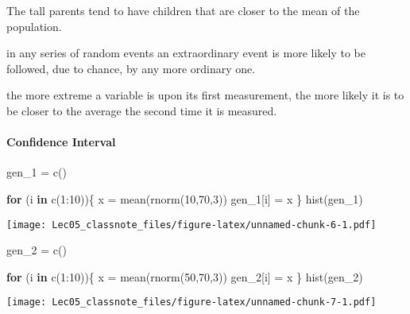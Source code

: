 \documentclass[
]{article}
\newenvironment{Shaded}{\begin{snugshade}}{\end{snugshade}}
\newcommand{\ControlFlowTok}[1]{\textcolor[rgb]{0.13,0.29,0.53}{\textbf{#1}}}
\newcommand{\DecValTok}[1]{\textcolor[rgb]{0.00,0.00,0.81}{#1}}
\newcommand{\FunctionTok}[1]{\textcolor[rgb]{0.00,0.00,0.00}{#1}}
\newcommand{\NormalTok}[1]{#1}
\newcommand{\OtherTok}[1]{\textcolor[rgb]{0.56,0.35,0.01}{#1}}
\newcommand{\SpecialCharTok}[1]{\textcolor[rgb]{0.00,0.00,0.00}{#1}}
\begin{document}
The tall parents tend to have children that are closer to the mean of
the population.

in any series of random events an extraordinary event is more likely to
be followed, due to chance, by any more ordinary one.

the more extreme a variable is upon its first measurement, the more
likely it is to be closer to the average the second time it is measured.

\hypertarget{confidence-interval}{%
\paragraph{Confidence Interval}\label{confidence-interval}}

\begin{Shaded}
\begin{Highlighting}[]
\NormalTok{gen\_1 }\OtherTok{=} \FunctionTok{c}\NormalTok{()}

\ControlFlowTok{for}\NormalTok{ (i }\ControlFlowTok{in} \FunctionTok{c}\NormalTok{(}\DecValTok{1}\SpecialCharTok{:}\DecValTok{10}\NormalTok{))\{}
\NormalTok{  x }\OtherTok{=} \FunctionTok{mean}\NormalTok{(}\FunctionTok{rnorm}\NormalTok{(}\DecValTok{10}\NormalTok{,}\DecValTok{70}\NormalTok{,}\DecValTok{3}\NormalTok{))}
\NormalTok{  gen\_1[i] }\OtherTok{=}\NormalTok{ x}
\NormalTok{\}}
\FunctionTok{hist}\NormalTok{(gen\_1)}
\end{Highlighting}
\end{Shaded}

\texttt{[image: Lec05\_classnote\_files/figure-latex/unnamed-chunk-6-1.pdf]}

\begin{Shaded}
\begin{Highlighting}[]
\NormalTok{gen\_2 }\OtherTok{=} \FunctionTok{c}\NormalTok{()}

\ControlFlowTok{for}\NormalTok{ (i }\ControlFlowTok{in} \FunctionTok{c}\NormalTok{(}\DecValTok{1}\SpecialCharTok{:}\DecValTok{10}\NormalTok{))\{}
\NormalTok{  x }\OtherTok{=} \FunctionTok{mean}\NormalTok{(}\FunctionTok{rnorm}\NormalTok{(}\DecValTok{50}\NormalTok{,}\DecValTok{70}\NormalTok{,}\DecValTok{3}\NormalTok{))}
\NormalTok{  gen\_2[i] }\OtherTok{=}\NormalTok{ x}
\NormalTok{\}}
\FunctionTok{hist}\NormalTok{(gen\_2)}
\end{Highlighting}
\end{Shaded}

\texttt{[image: Lec05\_classnote\_files/figure-latex/unnamed-chunk-7-1.pdf]}
\end{document}
